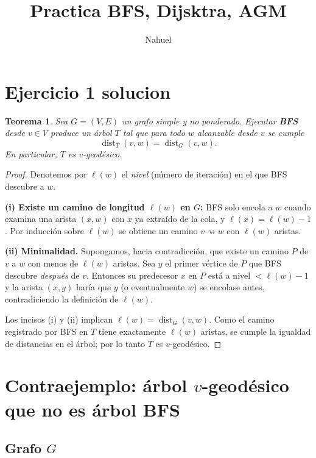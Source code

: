 \documentclass[11pt]{article}
\title{Practica BFS, Dijsktra, AGM}
\author{Nahuel}
\newtheorem{theorem}{Teorema}
\begin{document}
\maketitle
\section{Ejercicio 1 solucion}
\begin{theorem}
Sea $G=(V,E)$ un grafo simple y no ponderado.
Ejecutar \textbf{BFS} desde $v\in V$ produce un árbol $T$
tal que para todo $w$ alcanzable desde $v$ se cumple
\[
\operatorname{dist}_T(v,w)=\operatorname{dist}_G(v,w).
\]
En particular, $T$ es $v$-geodésico.
\end{theorem}

\begin{proof}
Denotemos por $\ell(w)$ el \emph{nivel} (número de iteración) en el que
BFS descubre a $w$.

\textbf{(i) Existe un camino de longitud $\ell(w)$ en $G$:}
BFS solo encola a $w$ cuando examina una arista $(x,w)$ con $x$ ya
extraído de la cola, y $\ell(x)=\ell(w)-1$.  Por inducción sobre
$\ell(w)$ se obtiene un camino $v\rightsquigarrow w$ con
$\ell(w)$ aristas.

\textbf{(ii) Minimalidad.}  Supongamos, hacia contradicción, que existe
un camino $P$ de $v$ a $w$ con menos de $\ell(w)$ aristas.  Sea $y$
el primer vértice de $P$ que BFS descubre \emph{después} de $v$.
Entonces su predecesor $x$ en $P$ está a nivel $<\ell(w)-1$ y la arista
$(x,y)$ haría que $y$ (o eventualmente $w$) se encolase antes,
contradiciendo la definición de $\ell(w)$.

Los incisos (i) y (ii) implican
$\ell(w)=\operatorname{dist}_G(v,w)$.
Como el camino registrado por BFS en $T$ tiene exactamente $\ell(w)$
aristas, se cumple la igualdad de distancias en el árbol;
por lo tanto $T$ es $v$-geodésico.
\end{proof}
\section*{Contraejemplo: árbol \(v\)-geodésico que no es árbol BFS}

\subsection*{Grafo \(G\)}
\end{document}
